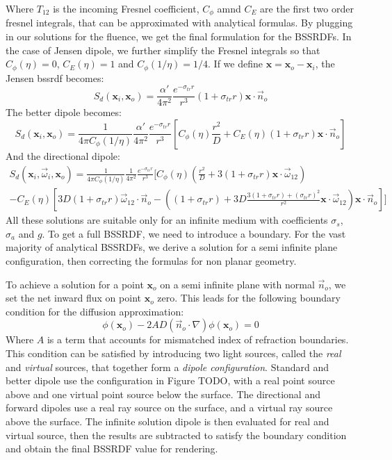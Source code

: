 Where $T_{12}$ is the incoming Fresnel coefficient, $C_\phi$ amnd $C_E$ are the first two order fresnel integrals, that can be approximated with analytical formulas. By plugging in our solutions for the fluence, we get the final formulation for the BSSRDFs. In the case of Jensen dipole, we further simplify the Fresnel integrals so that $C_\phi(\eta) = 0$, $C_E(\eta) = 1$ and $C_\phi(1/\eta) = 1/4$. If we define $\mathbf{x} = \mathbf{x}_o - \mathbf{x}_i$, the Jensen bssrdf becomes:
\begin{equation*}
S_d(\mathbf{x}_i, \mathbf{x}_o)  =  \frac{\alpha'}{4 \pi^2} \frac{e^{-\sigma_{tr} r}}{r^3} (1 + \sigma_{tr} r) \mathbf{x} \cdot \vec{n}_o 
\end{equation*}
The better dipole becomes:
\begin{equation*}
S_d(\mathbf{x}_i, \mathbf{x}_o)  = \frac{1}{4\pi C_\phi(1/\eta)} \frac{\alpha'}{4 \pi^2} \frac{e^{-\sigma_{tr} r}}{r^3} \left[ C_\phi(\eta) \frac{r^2}{D} + C_E(\eta) (1 + \sigma_{tr} r) \mathbf{x} \cdot \vec{n}_o \right]
\end{equation*}
And the directional dipole:
\begin{multline*}
S_d(\mathbf{x}_i, \vec{\omega}_i, \mathbf{x}_o)  = \frac{1}{4\pi C_\phi(1/\eta)} \frac{1}{4 \pi^2} \frac{e^{-\sigma_{tr} r}}{r^3} \bigg[ C_\phi(\eta) (\frac{r^2}{D} +  3 (1 + \sigma_{tr} r) \mathbf{x}\cdot\vec{\omega}_{12} ) \\ - C_E(\eta) \left[3D (1 + \sigma_{tr} r) \vec{\omega}_{12} \cdot \vec{n}_o - \left((1 + \sigma_{tr} r) + 3D \frac{3 (1 + \sigma_{tr} r)  + (\sigma_{tr} r)^2}{r^2}\mathbf{x}\cdot\vec{\omega}_{12}\right) \mathbf{x} \cdot \vec{n}_o\right] \bigg]
\end{multline*}
All these solutions are suitable only for an infinite medium with coefficients $\sigma_s$, $\sigma_a$ and $g$. To get a full BSSRDF, we need to introduce a boundary. For the vast majority of analytical BSSRDFs, we derive a solution for a semi infinite plane configuration, then correcting the formulas for non planar geometry. 

To achieve a solution for a point $\mathbf{x}_o$ on a semi infinite plane with normal $\vec{n}_o$, we set the net inward flux on point $\mathbf{x}_o$ zero. This leads for the following boundary condition for the diffusion approximation: 
\begin{equation*}
\phi(\mathbf{x}_o) - 2 A D (\vec{n}_o \cdot \nabla) \phi(\mathbf{x}_o) = 0
\end{equation*}
Where $A$ is a term that accounts for mismatched index of refraction boundaries. This condition can be satisfied by introducing two light sources, called the \emph{real} and \emph{virtual} sources, that together form a \emph{dipole configuration}. Standard and better dipole use the configuration in Figure TODO, with a real point source above and one virtual point source below the surface. The directional and forward dipoles use a real ray source on the surface, and a virtual ray source above the surface. The infinite solution dipole is then evaluated for real and virtual source, then the results are subtracted to satisfy the boundary condition and obtain the final BSSRDF value for rendering. 


